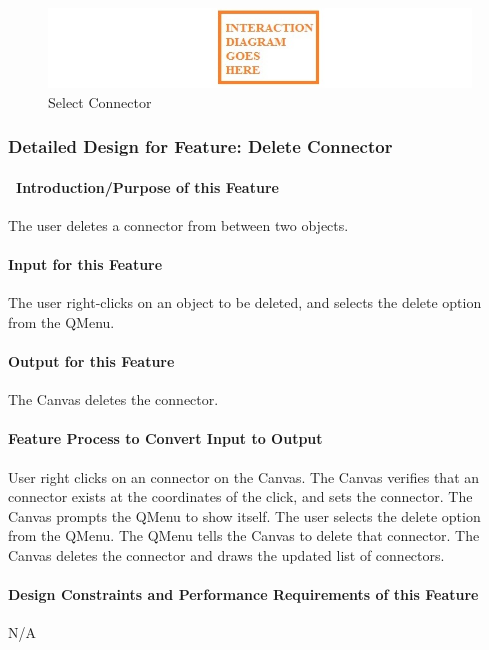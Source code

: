 \documentclass[twoside,letterpaper]{article}
\begin{document}
{{}
\bigskip

\begin{figure}[h]
\centering
\includegraphics[width=6.0in]{temp.jpg}
\caption{Select Connector}
\end{figure}

\clearpage


% 
%

\subsubsection{Detailed Design for Feature: Delete Connector}

\paragraph[\ Introduction/Purpose of this Feature]
{\ Introduction/Purpose of this Feature}
{
The user deletes a connector from between two objects.
}

\paragraph[Input for this Feature]{Input for this Feature}
{
The user right-clicks on an object to be deleted, and selects the delete option from the QMenu.
}

\paragraph{Output for this Feature}
{
The Canvas deletes the connector.
}

\paragraph{Feature Process to Convert Input to Output}
{
User right clicks on an connector on the Canvas. The Canvas verifies that an connector exists at the coordinates of the click, and sets the connector.  The Canvas prompts the QMenu to show itself.  The user selects the delete option from the QMenu.  The QMenu tells the Canvas to delete that connector. The Canvas deletes the connector and draws the updated list of connectors.
}

\paragraph{Design Constraints and Performance Requirements of this Feature}
{
N/A
}
\bigskip
\bigskip

}
\end{document}
